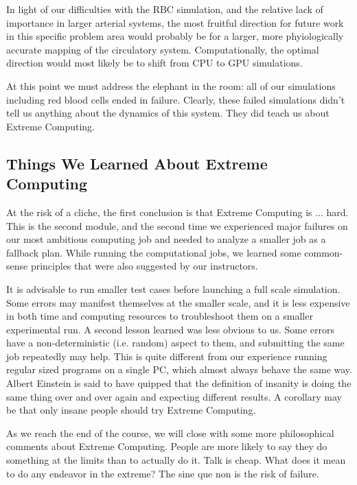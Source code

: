 \documentclass[11pt]{article} %
\begin{document}
In light of our difficulties with the RBC simulation, and the relative lack of importance
in larger arterial systems, the most fruitful direction for future work in this specific problem
area would probably be for a larger, more phyiologically accurate mapping of the circulatory system.  
Computationally, the optimal direction would most likely be to shift from CPU to GPU simulations.

At this point we must address the elephant in the room: 
all of our simulations including red blood cells ended in failure.
Clearly, these failed simulations didn't tell us anything about the dynamics of this system.
They did teach us about Extreme Computing.

\subsection{Things We Learned About Extreme Computing}
At the risk of a cliche, the first conclusion is that Extreme Computing is ... hard.
This is the second module, and the second time we experienced major failures on 
our most ambitious computing job and needed to analyze a smaller job as a fallback plan.
While running the computational jobs, we learned some common-sense principles that
were also suggested by our instructors.  

It is advisable to run smaller test cases before launching a full scale simulation.
Some errors may manifest themselves at the smaller scale, 
and it is less expensive in both time and computing resources to troubleshoot them
on a smaller experimental run.
A second lesson learned was less obvious to us.  
Some errors have a non-deterministic (i.e. random) aspect to them,
and submitting the same job repeatedly may help.
This is quite different from our experience running regular sized programs on a single
PC, which almost always behave the same way.
Albert Einstein is said to have quipped that the definition of insanity is doing the same thing 
over and over again and expecting different results.
A corollary may be that only insane people should try Extreme Computing.

As we reach the end of the course, we will close with some more 
philosophical comments about Extreme Computing.
People are more likely to say they do something at the limits than to actually do it.
Talk is cheap.  What does it mean to do any endeavor in the extreme?
The sine que non is the risk of failure.
\end{document}
